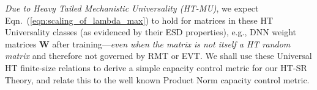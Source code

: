 \emph{Due to Heavy Tailed Mechanistic Universality (HT-MU)}, we expect Eqn.~(\ref{eqn:scaling_of_lambda_max}) to hold for matrices in these HT Universality classes (as evidenced by their ESD properties), e.g., DNN weight matrices $\mathbf{W}$ after training---\emph{even when the matrix is not itself a HT random matrix} and therefore not governed by RMT or EVT.
We shall use these Universal HT finite-size relations to derive a simple capacity control metric for our HT-SR Theory, and relate this to the well known Product Norm capacity control metric.




